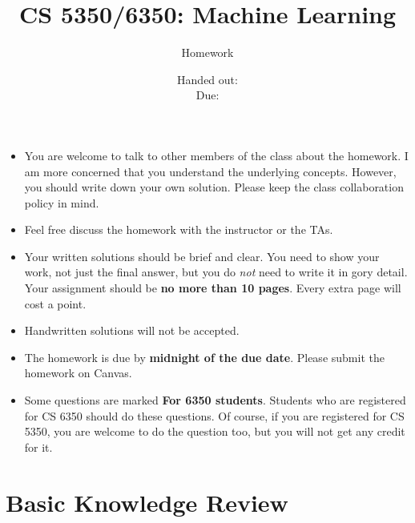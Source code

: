 \documentclass[12pt, fullpage,letterpaper]{article}
\title{CS 5350/6350: Machine Learning \semester}
\author{Homework \assignmentId}
\date{Handed out: \releaseDate\\
  Due: \dueDate}
\begin{document}
\maketitle


\footnotesize
	\begin{itemize}
		\item You are welcome to talk to other members of the class about
		the homework. I am more concerned that you understand the
		underlying concepts. However, you should write down your own
		solution. Please keep the class collaboration policy in mind.
		
		\item Feel free discuss the homework with the instructor or the TAs.
		
		\item Your written solutions should be brief and clear. You need to
		show your work, not just the final answer, but you do \emph{not}
		need to write it in gory detail. Your assignment should be {\bf no
			more than 10 pages}. Every extra page will cost a point.
		
		\item Handwritten solutions will not be accepted.
		
		\item The homework is due by \textbf{midnight of the due date}. Please submit
		the homework on Canvas.
		
		\item Some questions are marked {\bf For 6350 students}. Students
		who are registered for CS 6350 should do these questions. Of
		course, if you are registered for CS 5350, you are welcome to do
		the question too, but you will not get any credit for it.
		
	\end{itemize}



\section*{Basic Knowledge Review}
\label{sec:q1}

\end{document}
